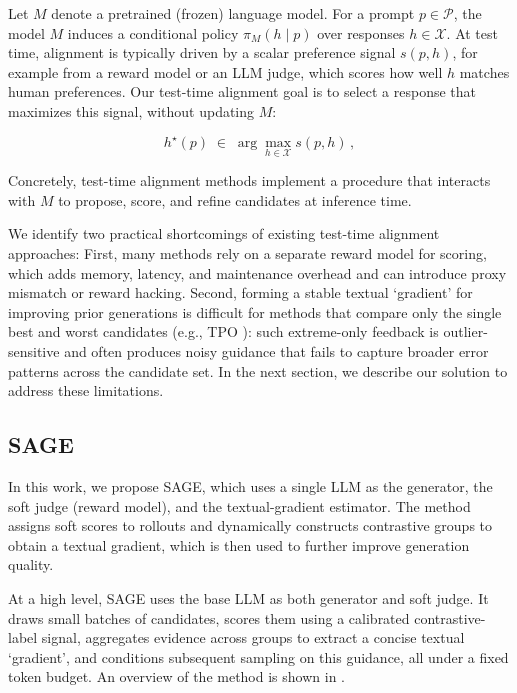 \documentclass[letterpaper]{article} %
\newcommand{\method}{SAGE}
\begin{document}
Let \(M\) denote a pretrained (frozen) language model. For a prompt \(p\in\mathcal{P}\), the model \(M\) induces a conditional policy \(\pi_{M}(h\mid p)\) over responses \(h\in\mathcal{X}\). At test time, alignment is typically driven by a scalar preference signal \(s(p,h)\), for example from a reward model or an LLM judge, which scores how well \(h\) matches human preferences. Our test-time alignment goal is to select a response that maximizes this signal, without updating \(M\):

\begin{equation}
h^\star(p)\;\in\;\arg\max_{h\in\mathcal{X}} s(p,h)\,,
\end{equation}

Concretely, test-time alignment methods implement a procedure that interacts with \(M\) to propose, score, and refine candidates at inference time.


We identify two practical shortcomings of existing test-time alignment approaches: First, many methods rely on a separate reward model for scoring, which adds memory, latency, and maintenance overhead and can introduce proxy mismatch or reward hacking. Second, forming a stable textual `gradient' for improving prior generations is difficult for methods that compare only the single best and worst candidates (e.g., TPO \cite{litest}): such extreme-only feedback is outlier-sensitive and often produces noisy guidance that fails to capture broader error patterns across the candidate set. In the next section, we describe our solution to address these limitations.


\subsection{SAGE}\label{method}
In this work, we propose \method{}, which uses a single LLM as the generator, the soft judge (reward model), and the textual-gradient estimator. The method assigns soft scores to rollouts and dynamically constructs contrastive groups to obtain a textual gradient, which is then used to further improve generation quality.

At a high level, \method{} uses the base LLM as both generator and soft judge. It draws small batches of candidates, scores them using a calibrated contrastive-label signal, aggregates evidence across groups to extract a concise textual `gradient', and conditions subsequent sampling on this guidance, all under a fixed token budget. An overview of the method is shown in .
\end{document}
